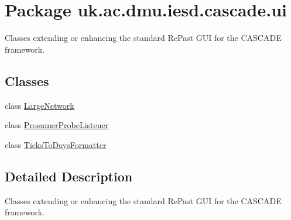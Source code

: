 \hypertarget{namespaceuk_1_1ac_1_1dmu_1_1iesd_1_1cascade_1_1ui}{\section{Package uk.\-ac.\-dmu.\-iesd.\-cascade.\-ui}
\label{namespaceuk_1_1ac_1_1dmu_1_1iesd_1_1cascade_1_1ui}
}


Classes extending or enhancing the standard Re\-Past G\-U\-I for the C\-A\-S\-C\-A\-D\-E framework.  


\subsection*{Classes}
\begin{DoxyCompactItemize}
\item 
class \hyperlink{classuk_1_1ac_1_1dmu_1_1iesd_1_1cascade_1_1ui_1_1_large_network}{Large\-Network}
\item 
class \hyperlink{classuk_1_1ac_1_1dmu_1_1iesd_1_1cascade_1_1ui_1_1_prosumer_probe_listener}{Prosumer\-Probe\-Listener}
\item 
class \hyperlink{classuk_1_1ac_1_1dmu_1_1iesd_1_1cascade_1_1ui_1_1_ticks_to_days_formatter}{Ticks\-To\-Days\-Formatter}
\end{DoxyCompactItemize}


\subsection{Detailed Description}
Classes extending or enhancing the standard Re\-Past G\-U\-I for the C\-A\-S\-C\-A\-D\-E framework. 